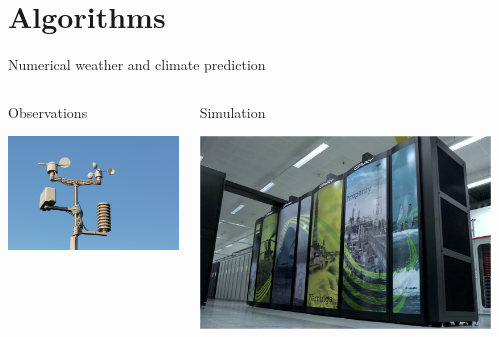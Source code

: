 \documentclass{beamer}
\begin{document}
\section{Algorithms}
\begin{frame}{Numerical weather and climate prediction}
  \begin{columns}[T]
    \begin{column}{0.33\textwidth}
      \centerline{Observations}
      \vspace{0.2cm}
      \centerline{\includegraphics[width=\columnwidth]{figures/obs.jpg}}
    \end{column}
    \begin{column}{0.33\textwidth}
      \centerline{Simulation}
      \vspace{0.2cm}
      \centerline{\includegraphics[width=\columnwidth]{figures/MOCray}}
    \end{column}
    \begin{column}{0.33\textwidth}

\end{column}
\end{columns}
\end{frame}
\end{document}
